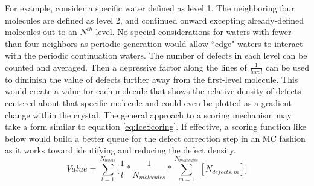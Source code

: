 For example, consider a specific water defined as level 1. 
The neighboring four molecules are defined as level 2, and continued onward excepting already-defined molecules out to an $N^{th}$ level. 
No special considerations for waters with fewer than four neighbors as periodic generation would allow ``edge" waters to interact with the periodic continuation waters.
The number of defects in each level can be counted and averaged.
Then a depressive factor along the lines of $\frac{1}{level}$ can be used to diminish the value of defects further away from the first-level molecule.
This would create a value for each molecule that shows the relative density of defects centered about that specific molecule and could even be plotted as a gradient change within the crystal.
The general approach to a scoring mechanism may take a form similar to equation \ref{eq:IceScoring}.
If effective, a scoring function like below would build a better queue for the defect correction step in an MC fashion as it works toward identifying and reducing the defect density.
\begin{equation}
\label{eq:IceScoring}
Value = \sum_{l=1}^{N_{levels}} \Big[\frac{1}{l} * \frac{1} {N_{molecules}} *\sum_{m=1}^{N_{molecules}}[N_{defects, m}]\Big]
\end{equation}





